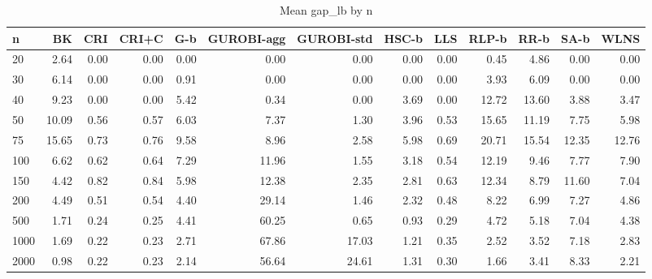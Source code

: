 \begin{table}[htbp]
\centering
\small
\caption{Mean gap\_lb by n}
\label{tab:E4a_equal_budgets_b1_by_n}
\begin{tabular}{lrrrrrrrrrrrr}
\toprule
n & BK & CRI & CRI+C & G-b & GUROBI-agg & GUROBI-std & HSC-b & LLS & RLP-b & RR-b & SA-b & WLNS \\
\midrule
20 & 2.64 & 0.00 & 0.00 & 0.00 & 0.00 & 0.00 & 0.00 & 0.00 & 0.45 & 4.86 & 0.00 & 0.00 \\
30 & 6.14 & 0.00 & 0.00 & 0.91 & 0.00 & 0.00 & 0.00 & 0.00 & 3.93 & 6.09 & 0.00 & 0.00 \\
40 & 9.23 & 0.00 & 0.00 & 5.42 & 0.34 & 0.00 & 3.69 & 0.00 & 12.72 & 13.60 & 3.88 & 3.47 \\
50 & 10.09 & 0.56 & 0.57 & 6.03 & 7.37 & 1.30 & 3.96 & 0.53 & 15.65 & 11.19 & 7.75 & 5.98 \\
75 & 15.65 & 0.73 & 0.76 & 9.58 & 8.96 & 2.58 & 5.98 & 0.69 & 20.71 & 15.54 & 12.35 & 12.76 \\
100 & 6.62 & 0.62 & 0.64 & 7.29 & 11.96 & 1.55 & 3.18 & 0.54 & 12.19 & 9.46 & 7.77 & 7.90 \\
150 & 4.42 & 0.82 & 0.84 & 5.98 & 12.38 & 2.35 & 2.81 & 0.63 & 12.34 & 8.79 & 11.60 & 7.04 \\
200 & 4.49 & 0.51 & 0.54 & 4.40 & 29.14 & 1.46 & 2.32 & 0.48 & 8.22 & 6.99 & 7.27 & 4.86 \\
500 & 1.71 & 0.24 & 0.25 & 4.41 & 60.25 & 0.65 & 0.93 & 0.29 & 4.72 & 5.18 & 7.04 & 4.38 \\
1000 & 1.69 & 0.22 & 0.23 & 2.71 & 67.86 & 17.03 & 1.21 & 0.35 & 2.52 & 3.52 & 7.18 & 2.83 \\
2000 & 0.98 & 0.22 & 0.23 & 2.14 & 56.64 & 24.61 & 1.31 & 0.30 & 1.66 & 3.41 & 8.33 & 2.21 \\
\bottomrule
\end{tabular}
\end{table}
